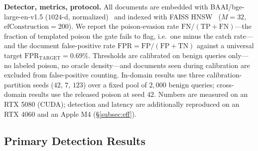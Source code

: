 \documentclass[10pt,journal,compsoc]{IEEEtran}
\begin{document}
\noindent\textbf{Detector, metrics, protocol.} All documents are embedded with
BAAI/bge-large-en-v1.5 ($1024$-d, normalized)~\cite{bge} and indexed with FAISS
HNSW~\cite{faiss,hnsw} ($M=32$, $\mathrm{efConstruction}=200$). We report the
poison-evasion rate $\mathrm{FN}/(\mathrm{TP}+\mathrm{FN})$---the fraction of
templated poison the gate fails to flag, i.e.\ one minus the catch rate---and the
document false-positive rate $\mathrm{FPR}=\mathrm{FP}/(\mathrm{FP}+\mathrm{TN})$
against a universal target $\mathrm{FPR}_{\mathrm{TARGET}}=0.69\%$. Thresholds are
calibrated on benign queries only---no labeled poison, no oracle density---and
documents seen during calibration are excluded from false-positive counting.
In-domain results use three calibration-partition seeds ($42$, $7$, $123$) over a
fixed pool of $2{,}000$ benign queries; cross-domain results use the released
poison at seed $42$. Numbers are measured on an RTX 5080 (CUDA); detection and
latency are additionally reproduced on an RTX 4060 and an Apple M4
(\S\ref{subsec:eff}).

\subsection{Primary Detection Results}
\label{subsec:main}
\end{document}
